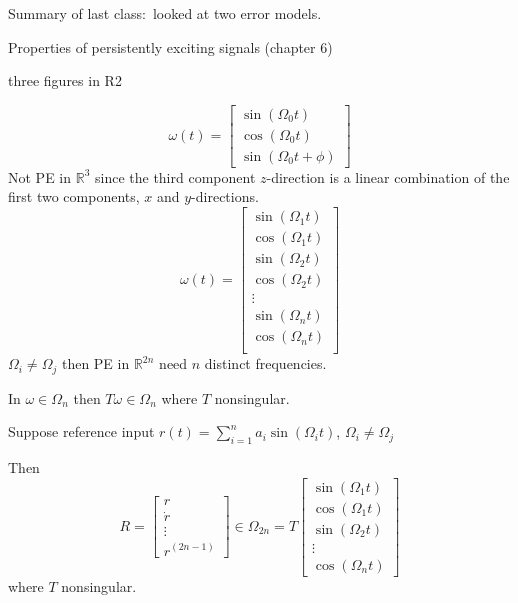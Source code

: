 Summary of last class:\ looked at two error models.

Properties of persistently exciting signals (chapter 6)


three figures in R2

\begin{equation*}
  \omega(t)=
  \begin{bmatrix}
    \sin(\Omega_{0}t) \\
    \cos(\Omega_{0}t) \\
    \sin(\Omega_{0}t+\phi)
  \end{bmatrix}
  \end{equation*}
  Not PE in $\mathbb{R}^{3}$ since the third component $z$-direction is a linear combination of the first two components, $x$ and $y$-directions.
  \begin{equation*}
    \omega(t)=
    \begin{bmatrix}
      \sin(\Omega_{1}t) \\
      \cos(\Omega_{1}t) \\
      \sin(\Omega_{2}t) \\
      \cos(\Omega_{2}t) \\
      \vdots \\
      \sin(\Omega_{n}t) \\
      \cos(\Omega_{n}t) \\
    \end{bmatrix}
\end{equation*}
$\Omega_{i}\neq\Omega_{j}$ then PE in $\mathbb{R}^{2n}$ need $n$ distinct frequencies.

In $\omega\in\Omega_{n}$ then $T\omega\in\Omega_{n}$ where $T$ nonsingular.

Suppose reference input $r(t)=\sum_{i=1}^{n}a_{i}\sin(\Omega_{i}t)$, $\Omega_{i}\neq\Omega_{j}$

Then
\begin{equation*}
  R=
  \begin{bmatrix}
    r \\
    \dot{r} \\
    \vdots \\
    r^{(2n-1)}
  \end{bmatrix}
  \in\Omega_{2n}=
  T
  \begin{bmatrix}
    \sin(\Omega_{1}t) \\
    \cos(\Omega_{1}t) \\
    \sin(\Omega_{2}t) \\
    \vdots \\
    \cos(\Omega_{n}t)
  \end{bmatrix}
\end{equation*}
where $T$ nonsingular.

